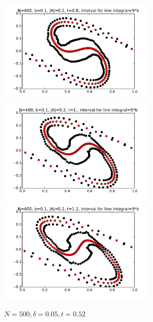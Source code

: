 \documentclass[12pt,twoside]{article}
\begin{document}
\begin{figure}[ht]
\begin{minipage}[b]{0.45\linewidth}
\includegraphics[width=3in,height=2in]{t08_B01.pdf}
\includegraphics[width=3in,height=2in]{t10_B01.pdf}
\includegraphics[width=3in,height=2in]{t12_B01.pdf}
\caption{$N=500 , \delta=0.05 ,  t=0.52$ }
\end{minipage}
\end{figure}
\end{document}
